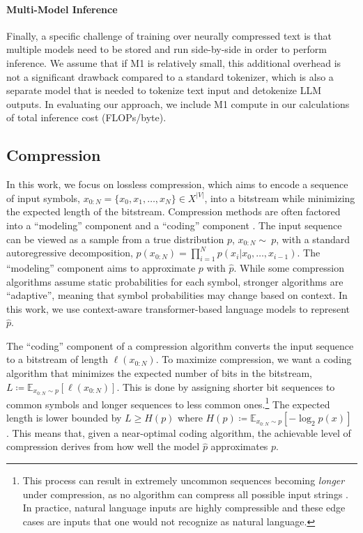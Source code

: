 \paragraph{Multi-Model Inference} Finally, a specific challenge of training over neurally compressed text is that multiple models need to be stored and run side-by-side in order to perform inference. We assume that if M1 is relatively small, this additional overhead is not a significant drawback compared to a standard tokenizer, which is also a separate model that is needed to tokenize text input and detokenize LLM outputs. In evaluating our approach, we include M1 compute in our calculations of total inference cost (FLOPs/byte).

\subsection{Compression}

In this work, we focus on lossless compression, which aims to encode a sequence of input symbols, $x_{0:N} = \{x_0, x_1, \dots, x_N\} \in X^{|V|}$, into a bitstream while minimizing the expected length of the bitstream. Compression methods are often factored into a ``modeling'' component and a ``coding'' component \cite{mahoneyDataCompressionExplained2013}. The input sequence can be viewed as a sample from a true distribution $p$, $x_{0:N}\sim~p$, with a standard autoregressive decomposition, $p(x_{0:N}) = \prod_{i=1}^{N} p(x_i|x_0, \dots, x_{i-1})$. The ``modeling'' component aims to approximate $p$ with $\hat{p}$. While some compression algorithms assume static probabilities for each symbol, stronger algorithms are ``adaptive'', meaning that symbol probabilities may change based on context. In this work, we use context-aware transformer-based language models to represent $\hat{p}$.

The ``coding'' component of a compression algorithm converts the input sequence to a bitstream of length $\ell(x_{0:N})$. To maximize compression, we want a coding algorithm that minimizes the expected number of bits in the bitstream, $L \coloneqq \mathbb{E}_{x_{0:N}\sim p}[\ell(x_{0:N})]$. This is done by assigning shorter bit sequences to common symbols and longer sequences to less common ones.\footnote{This process can result in extremely uncommon sequences becoming \emph{longer} under compression, as no algorithm can compress all possible input strings \cite{mahoneyDataCompressionExplained2013}. In practice, natural language inputs are highly compressible and these edge cases are inputs that one would not recognize as natural language.} The expected length is lower bounded by $L \geq H(p)$ where $H(p) \coloneqq \mathbb{E}_{x_{0:N} \sim p}[- \log_2 p(x)]$ \cite{shannonMathematicalTheoryCommunication1948}. This means that, given a near-optimal coding algorithm, the achievable level of compression derives from how well the model $\hat{p}$ approximates $p$.

